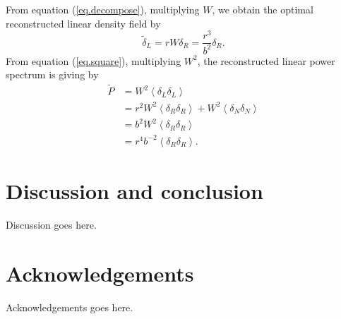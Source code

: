 \documentclass[aps,prd,twocolumn,superscriptaddress,amsfont,amssymb,amsmath,nofootinbib,showpacs,balancelastpage]{revtex4-1}
\begin{document}
From equation (\ref{eq.decompose}), multiplying $W$, we obtain the optimal reconstructed linear density field by
\begin{equation}
    \tilde\delta_L=rW\delta_R=\frac{r^3}{b^2}\delta_R.
\end{equation}
From equation (\ref{eq.square}), multiplying $W^2$, the reconstructed linear power spectrum is giving by
\begin{equation}
\begin{aligned}
    \tilde{P}&=W^2\left\langle\delta_L\delta_L\right\rangle  \\
    &=r^2W^2\left\langle\delta_R\delta_R\right\rangle +W^2\left\langle\delta_N\delta_N\right\rangle  \\
    &=b^2W^2\left\langle\delta_R\delta_R\right\rangle  \\
    &=r^4b^{-2}\left\langle\delta_R\delta_R\right\rangle.
\end{aligned}
\end{equation}




\section{Discussion and conclusion}\label{sec.discussion}
Discussion goes here.

\section*{Acknowledgements}
Acknowledgements goes here.

%


\end{document}
